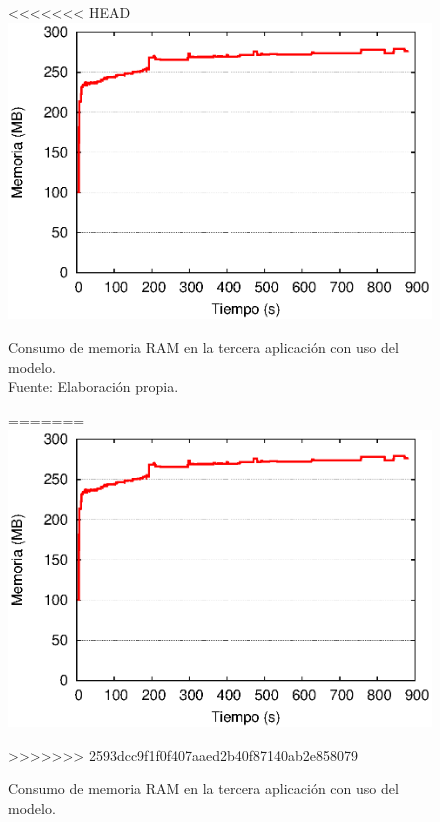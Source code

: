 \begin{figure}[!ht]
<<<<<<< HEAD
	\centering
	\captionsetup{justification=centering}
    \includegraphics[scale=0.7]{images/exp/app3/cm/fisical/consumeRAM.eps}
    \caption[Consumo de memoria RAM en la tercera aplicación con uso del modelo.]{Consumo de memoria RAM en la tercera aplicación con uso del modelo.\\Fuente: Elaboración propia.}
=======
\centering
    \includegraphics[scale=0.75]{images/exp/app3/cm/fisical/consumeRAM.eps}
    \caption{Consumo de memoria RAM en la tercera aplicaci\'on con uso del modelo.}
>>>>>>> 2593dcc9f1f0f407aaed2b40f87140ab2e858079
    \label{fig:app3-consumeRAM-cm}
\end{figure}

